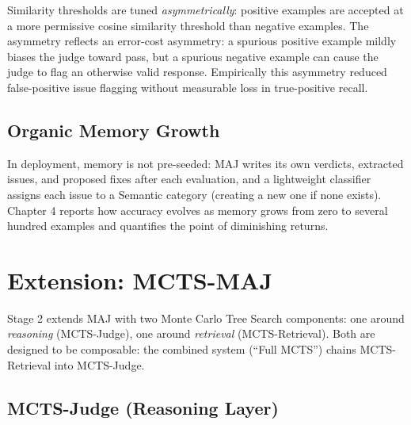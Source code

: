 \documentclass[12pt,a4paper]{report}
\begin{document}
Similarity thresholds are tuned \textit{asymmetrically}: positive examples are accepted at a more permissive cosine similarity threshold than negative examples. The asymmetry reflects an error-cost asymmetry: a spurious positive example mildly biases the judge toward pass, but a spurious negative example can cause the judge to flag an otherwise valid response. Empirically this asymmetry reduced false-positive issue flagging without measurable loss in true-positive recall.

\subsection{Organic Memory Growth}

In deployment, memory is not pre-seeded: MAJ writes its own verdicts, extracted issues, and proposed fixes after each evaluation, and a lightweight classifier assigns each issue to a Semantic category (creating a new one if none exists). Chapter 4 reports how accuracy evolves as memory grows from zero to several hundred examples and quantifies the point of diminishing returns.

\section{Extension: MCTS-MAJ}
\label{sec:mcts-maj}

Stage 2 extends MAJ with two Monte Carlo Tree Search components: one around \textit{reasoning} (MCTS-Judge), one around \textit{retrieval} (MCTS-Retrieval). Both are designed to be composable: the combined system (``Full MCTS'') chains MCTS-Retrieval into MCTS-Judge.

\subsection{MCTS-Judge (Reasoning Layer)}
\end{document}

